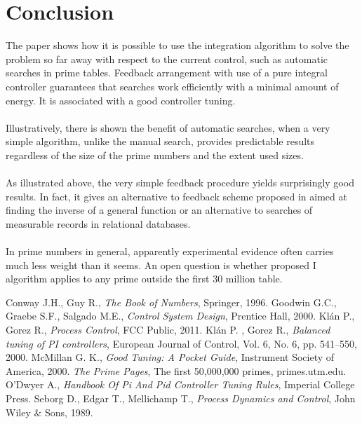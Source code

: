 \documentclass[12pt,a4paper,twoside]{article}
\begin{document}
\section{Conclusion}

\vspace{0.3cm}\noindent The paper shows how it is possible to use the integration algorithm to solve the problem so far away with respect to the current control, such as automatic searches in prime tables. Feedback arrangement with use of a pure integral controller guarantees that searches work efficiently with a minimal amount of energy. It is associated with a good controller tuning. \\
\\
Illustratively, there is shown the benefit of automatic searches, when a very simple algorithm, unlike the manual search, provides predictable results regardless of the size of the prime numbers and the extent used sizes.\\
\\
As illustrated above, the very simple feedback procedure yields surprisingly good results. In fact, it gives an alternative to feedback scheme proposed in \cite{ggs} aimed at finding the inverse of a general function or an alternative to searches of measurable records in relational databases.\\
\\  
In prime numbers in general, apparently experimental evidence often carries much less weight than it seems. An open question is whether proposed I algorithm applies to any prime outside the first $30$ million table.

\vspace{0.2cm}
\begin{thebibliography}{9}

 Conway J.H., Guy R., \emph{The Book of Numbers}, Springer, 1996.
  Goodwin G.C., Graebe S.F., Salgado M.E., \emph{Control System Design}, Prentice Hall, 2000.
 Kl\'{a}n P., Gorez R., \emph{Process Control}, FCC Public, 2011.
 Kl\'{a}n P. , Gorez R., \emph{Balanced tuning of PI controllers}, European Journal of Control, Vol. 6, No. 6, pp. 541--550, 2000. 
 McMillan G. K., \emph{Good Tuning: A Pocket Guide}, Instrument Society of America, 2000.
 \emph{The Prime Pages}, The first 50,000,000 primes, primes.utm.edu.
 O'Dwyer A., \emph{Handbook Of Pi And Pid Controller Tuning Rules}, Imperial College Press.
 Seborg D., Edgar T., Mellichamp T., \emph{Process Dynamics and Control}, John Wiley $\&$ Sons, 1989.
\end{thebibliography}
\end{document}
